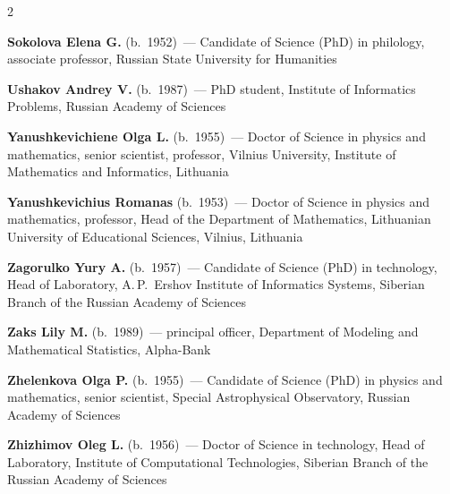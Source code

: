 \begin{multicols}{2}
\pagebreak

\noindent
\textbf{Sokolova Elena G.}  (b.\ 1952)~--- Candidate of Science (PhD) in philology, 
associate professor, Russian State University for Humanities



\vspace*{5pt}

\noindent
\textbf{Ushakov Andrey V.} (b.\ 1987)~--- PhD student, Institute of Informatics Problems, Russian
Academy of Sciences

\vspace*{5pt}

\noindent
\textbf{Yanushkevichiene Olga L.} (b.\ 1955)~--- Doctor of Science in physics and mathematics, 
senior scientist, professor, Vilnius University, Institute of Mathematics and Informatics, 
Lithuania


\vspace*{5pt}

\noindent
\textbf{Yanushkevichius Romanas} (b.\ 1953)~--- Doctor of Science in physics and mathematics, 
professor, Head of the Department of Mathematics, 
Lithuanian University of Educational Sciences, Vilnius, Lithuania


\columnbreak

\noindent
\textbf{Zagorulko Yury A.}  (b.\ 1957)~--- Candidate of Science (PhD) in technology, 
Head of Laboratory, A.\,P.~Ershov Institute of Informatics Systems, Siberian 
Branch of the Russian Academy of Sciences

\vspace*{5pt}

\noindent
\textbf{Zaks Lily M.} (b.\ 1989)~--- principal officer, Department of Modeling and 
Mathematical Statistics, Alpha-Bank


\vspace*{5pt}

\noindent
\textbf{Zhelenkova Olga P.} (b.\ 1955)~--- Candidate of Science (PhD) in physics and 
mathematics, senior scientist, Special Astrophysical Observatory, Russian Academy of Sciences

\vspace*{5pt}

\noindent
\textbf{Zhizhimov Oleg L.} (b.\ 1956)~--- Doctor of Science in technology, 
Head of Laboratory, Institute of Computational Technologies,
Siberian Branch of the Russian Academy of Sciences

\def\leftfootline{\small{\textbf{\thepage}
\hfill ����������� � �� ����������\ \ \ ⮬~6\ \ \ ����~3\ \ \ 2012}
}%
 \def\rightfootline{\small{����������� � �� ����������\ \ \ ⮬~6\ \ \ ����~3\ \ \ 2012
\hfill \textbf{\thepage}}}



\end{multicols}
\newpage

